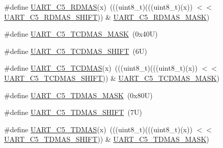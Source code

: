 \begin{DoxyCompactItemize}
\item 
\#define \mbox{\hyperlink{group___u_a_r_t___register___masks_ga3e482d8d4ea645ab1cb89bad9c899194}{U\+A\+R\+T\+\_\+\+C5\+\_\+\+R\+D\+M\+AS}}(x)~(((uint8\+\_\+t)(((uint8\+\_\+t)(x)) $<$$<$ \mbox{\hyperlink{group___u_a_r_t___register___masks_gab95d268a11167ac6ab4cf41332bf5aa6}{U\+A\+R\+T\+\_\+\+C5\+\_\+\+R\+D\+M\+A\+S\+\_\+\+S\+H\+I\+FT}})) \& \mbox{\hyperlink{group___u_a_r_t___register___masks_gaef3503f3521ec37397d2d19e7da7bd58}{U\+A\+R\+T\+\_\+\+C5\+\_\+\+R\+D\+M\+A\+S\+\_\+\+M\+A\+SK}})
\item 
\#define \mbox{\hyperlink{group___u_a_r_t___register___masks_ga56d0ab795510b62023ec9f2bccc682f8}{U\+A\+R\+T\+\_\+\+C5\+\_\+\+T\+C\+D\+M\+A\+S\+\_\+\+M\+A\+SK}}~(0x40\+U)
\item 
\#define \mbox{\hyperlink{group___u_a_r_t___register___masks_ga4059c528ae59fbbb881b5e98505733a0}{U\+A\+R\+T\+\_\+\+C5\+\_\+\+T\+C\+D\+M\+A\+S\+\_\+\+S\+H\+I\+FT}}~(6\+U)
\item 
\#define \mbox{\hyperlink{group___u_a_r_t___register___masks_ga78964c4076356fa8d6ad0f825ff40609}{U\+A\+R\+T\+\_\+\+C5\+\_\+\+T\+C\+D\+M\+AS}}(x)~(((uint8\+\_\+t)(((uint8\+\_\+t)(x)) $<$$<$ \mbox{\hyperlink{group___u_a_r_t___register___masks_ga4059c528ae59fbbb881b5e98505733a0}{U\+A\+R\+T\+\_\+\+C5\+\_\+\+T\+C\+D\+M\+A\+S\+\_\+\+S\+H\+I\+FT}})) \& \mbox{\hyperlink{group___u_a_r_t___register___masks_ga56d0ab795510b62023ec9f2bccc682f8}{U\+A\+R\+T\+\_\+\+C5\+\_\+\+T\+C\+D\+M\+A\+S\+\_\+\+M\+A\+SK}})
\item 
\#define \mbox{\hyperlink{group___u_a_r_t___register___masks_ga593bf2d9f1d2a222d8cbde7b88aba833}{U\+A\+R\+T\+\_\+\+C5\+\_\+\+T\+D\+M\+A\+S\+\_\+\+M\+A\+SK}}~(0x80\+U)
\item 
\#define \mbox{\hyperlink{group___u_a_r_t___register___masks_gadf4f03768249772994b3082c369698e7}{U\+A\+R\+T\+\_\+\+C5\+\_\+\+T\+D\+M\+A\+S\+\_\+\+S\+H\+I\+FT}}~(7\+U)
\item 
\#define \mbox{\hyperlink{group___u_a_r_t___register___masks_gaea4ac16ae4172f75bf05eb28f8bcd6d5}{U\+A\+R\+T\+\_\+\+C5\+\_\+\+T\+D\+M\+AS}}(x)~(((uint8\+\_\+t)(((uint8\+\_\+t)(x)) $<$$<$ \mbox{\hyperlink{group___u_a_r_t___register___masks_gadf4f03768249772994b3082c369698e7}{U\+A\+R\+T\+\_\+\+C5\+\_\+\+T\+D\+M\+A\+S\+\_\+\+S\+H\+I\+FT}})) \& \mbox{\hyperlink{group___u_a_r_t___register___masks_ga593bf2d9f1d2a222d8cbde7b88aba833}{U\+A\+R\+T\+\_\+\+C5\+\_\+\+T\+D\+M\+A\+S\+\_\+\+M\+A\+SK}})
\end{DoxyCompactItemize}
